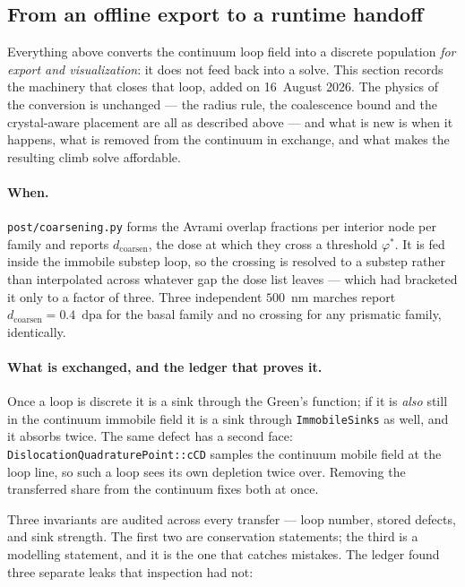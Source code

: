 \documentclass[11pt,a4paper]{article}
\newcommand{\code}[1]{\texttt{\small #1}}
\newcommand{\dpa}{\ensuremath{\mathrm{dpa}}}
\begin{document}
\subsection{From an offline export to a runtime handoff}
\label{sec:runtime-handoff}

Everything above converts the continuum loop field into a discrete population
\emph{for export and visualization}: it does not feed back into a solve. This
section records the machinery that closes that loop, added on 16~August 2026.
The physics of the conversion is unchanged --- the radius rule, the coalescence
bound and the crystal-aware placement are all as described above --- and what is
new is when it happens, what is removed from the continuum in exchange, and what
makes the resulting climb solve affordable.

\paragraph{When.} \code{post/coarsening.py} forms the Avrami overlap fractions
per interior node per family and reports $d_{\text{coarsen}}$, the dose at which
they cross a threshold $\varphi^\ast$. It is fed inside the immobile substep
loop, so the crossing is resolved to a substep rather than interpolated across
whatever gap the dose list leaves --- which had bracketed it only to a factor of
three. Three independent $500$~nm marches report $d_{\text{coarsen}} = 0.4$~\dpa{}
for the basal family and no crossing for any prismatic family, identically.

\paragraph{What is exchanged, and the ledger that proves it.} Once a loop is
discrete it is a sink through the Green's function; if it is \emph{also} still
in the continuum immobile field it is a sink through \code{ImmobileSinks} as
well, and it absorbs twice. The same defect has a second face:
\code{DislocationQuadraturePoint::cCD} samples the continuum mobile field at the
loop line, so such a loop sees its own depletion twice over. Removing the
transferred share from the continuum fixes both at once.

Three invariants are audited across every transfer --- loop number, stored
defects, and sink strength. The first two are conservation statements; the third
is a modelling statement, and it is the one that catches mistakes. The ledger
found three separate leaks that inspection had not:
\end{document}

